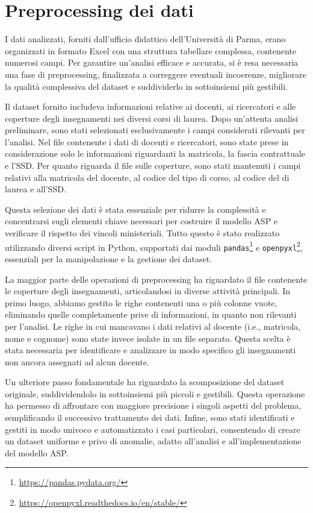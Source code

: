 \section{Preprocessing dei dati}
\label{sec:pre-proc}

I dati analizzati, forniti dall'ufficio didattico dell'Università di Parma, 
erano organizzati in formato Excel con una struttura tabellare complessa, contenente 
numerosi campi. Per garantire un'analisi efficace e accurata, si è resa necessaria una 
fase di preprocessing, finalizzata a correggere eventuali incoerenze, migliorare la 
qualità complessiva del dataset e suddividerlo in sottoinsiemi più gestibili.

Il dataset fornito includeva informazioni relative ai docenti, ai ricercatori e alle 
coperture degli insegnamenti nei diversi corsi di laurea. Dopo un'attenta analisi 
preliminare, sono stati selezionati esclusivamente i campi considerati rilevanti per 
l'analisi. Nel file contenente i dati di docenti e ricercatori, sono state prese in 
considerazione solo le informazioni riguardanti la matricola, la fascia contrattuale 
e l'SSD. Per quanto riguarda il file sulle coperture, sono stati mantenuti i campi 
relativi alla matricola del docente, al codice del tipo di corso, al codice del 
di laurea e all'SSD.

Questa selezione dei dati è stata essenziale per ridurre la complessità e concentrarsi 
sugli elementi chiave necessari per costruire il modello ASP e verificare il rispetto 
dei vincoli ministeriali. Tutto questo è stato realizzato utilizzando diversi script in 
Python, supportati dai moduli \texttt{pandas}\footnote{\url{https://pandas.pydata.org/}} 
e \texttt{openpyxl}\footnote{\url{https://openpyxl.readthedocs.io/en/stable/}}, 
essenziali per la manipolazione e la gestione dei dataset.

La maggior parte delle operazioni di preprocessing ha riguardato il file contenente 
le coperture degli insegnamenti, articolandosi in diverse attività principali. 
In primo luogo, abbiamo gestito le righe contenenti una o più colonne vuote, 
eliminando quelle completamente prive di informazioni, in quanto non rilevanti 
per l'analisi. Le righe in cui mancavano i dati relativi al docente (i.e., matricola, 
nome e cognome) sono state invece isolate in un file separato. Questa scelta è stata 
necessaria per identificare e analizzare in modo specifico gli insegnamenti non 
ancora assegnati ad alcun docente.

Un ulteriore passo fondamentale ha riguardato la scomposizione del dataset originale, 
suddividendolo in sottoinsiemi più piccoli e gestibili. Questa operazione ha permesso 
di affrontare con maggiore precisione i singoli aspetti del problema, semplificando il 
successivo trattamento dei dati. Infine, sono stati identificati e gestiti in modo 
univoco e automatizzato i casi particolari, consentendo di creare un dataset uniforme 
e privo di anomalie, adatto all'analisi e all'implementazione del modello ASP.

